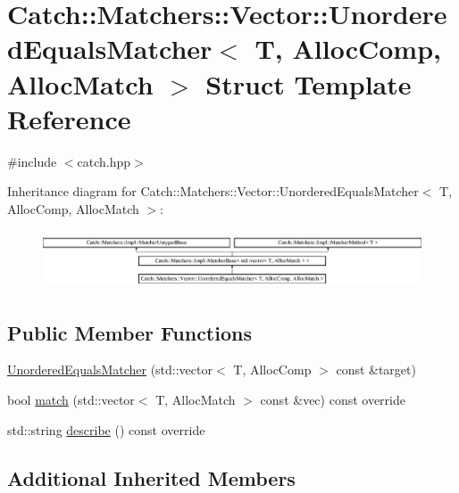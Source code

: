 \hypertarget{struct_catch_1_1_matchers_1_1_vector_1_1_unordered_equals_matcher}{}\section{Catch\+:\+:Matchers\+:\+:Vector\+:\+:Unordered\+Equals\+Matcher$<$ T, Alloc\+Comp, Alloc\+Match $>$ Struct Template Reference}
\label{struct_catch_1_1_matchers_1_1_vector_1_1_unordered_equals_matcher}


{\ttfamily \#include $<$catch.\+hpp$>$}

Inheritance diagram for Catch\+:\+:Matchers\+:\+:Vector\+:\+:Unordered\+Equals\+Matcher$<$ T, Alloc\+Comp, Alloc\+Match $>$\+:\begin{figure}[H]
\begin{center}
\leavevmode
\includegraphics[height=1.750000cm]{struct_catch_1_1_matchers_1_1_vector_1_1_unordered_equals_matcher}
\end{center}
\end{figure}
\subsection*{Public Member Functions}
\begin{DoxyCompactItemize}
\item 
\mbox{\hyperlink{struct_catch_1_1_matchers_1_1_vector_1_1_unordered_equals_matcher_ab78e6bbbad05472815a695650edc062c}{Unordered\+Equals\+Matcher}} (std\+::vector$<$ T, Alloc\+Comp $>$ const \&target)
\item 
bool \mbox{\hyperlink{struct_catch_1_1_matchers_1_1_vector_1_1_unordered_equals_matcher_abd5547585ba722cf3bb7aa3f9a8ffc0e}{match}} (std\+::vector$<$ T, Alloc\+Match $>$ const \&vec) const override
\item 
std\+::string \mbox{\hyperlink{struct_catch_1_1_matchers_1_1_vector_1_1_unordered_equals_matcher_a33b685a1505a0afe06ded7e0d207bc14}{describe}} () const override
\end{DoxyCompactItemize}
\subsection*{Additional Inherited Members}


